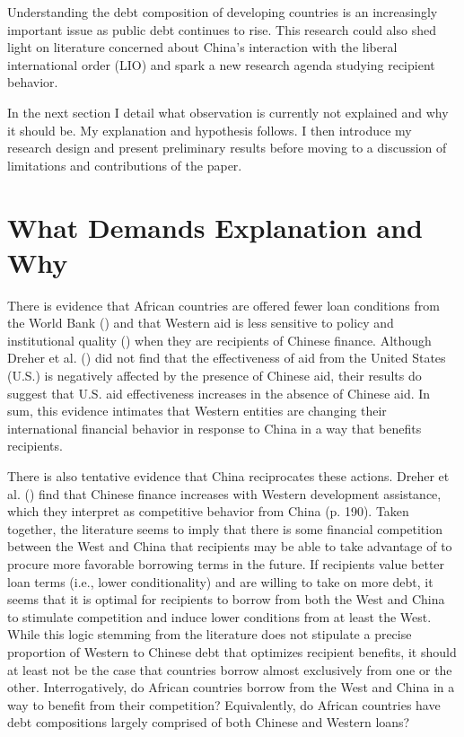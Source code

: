 \documentclass[12pt]{article}
\begin{document}
Understanding the debt composition of developing countries is an increasingly important issue as public debt continues to rise. This research could also shed light on literature concerned about China's interaction with the liberal international order (LIO) and spark a new research agenda studying recipient behavior.

In the next section I detail what observation is currently not explained and why it should be. My explanation and hypothesis follows. I then introduce my research design and present preliminary results before moving to a discussion of limitations and contributions of the paper.

\section*{What Demands Explanation and Why}
There is evidence that African countries are offered fewer loan conditions from the World Bank (\cite{hernandez2017}) and that Western aid is less sensitive to policy and institutional quality (\cite{annen2021}) when they are recipients of Chinese finance. Although Dreher et al. (\citeyear{dreher2021}) did not find that the effectiveness of aid from the United States (U.S.) is negatively affected by the presence of Chinese aid, their results do suggest that U.S. aid effectiveness increases in the absence of Chinese aid. In sum, this evidence intimates that Western entities are changing their international financial behavior in response to China in a way that benefits recipients.

There is also tentative evidence that China reciprocates these actions. Dreher et al. (\citeyear{dreher2018}) find that Chinese finance increases with Western development assistance, which they interpret as competitive behavior from China (p. 190). Taken together, the literature seems to imply that there is some financial competition between the West and China that recipients may be able to take advantage of to procure more favorable borrowing terms in the future. If recipients value better loan terms (i.e., lower conditionality) and are willing to take on more debt, it seems that it is optimal for recipients to borrow from both the West and China to stimulate competition and induce lower conditions from at least the West. While this logic stemming from the literature does not stipulate a precise proportion of Western to Chinese debt that optimizes recipient benefits, it should at least not be the case that countries borrow almost exclusively from one or the other. Interrogatively, do African countries borrow from the West and China in a way to benefit from their competition? Equivalently, do African countries have debt compositions largely comprised of both Chinese and Western loans?
\end{document}
